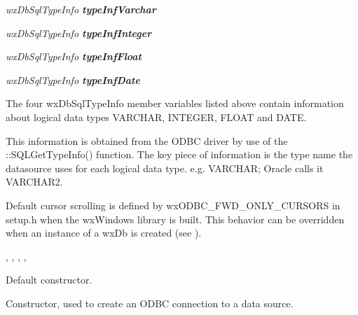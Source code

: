 


{\it wxDbSqlTypeInfo {\bf typeInfVarchar}}

{\it wxDbSqlTypeInfo {\bf typeInfInteger}}

{\it wxDbSqlTypeInfo {\bf typeInfFloat}}

{\it wxDbSqlTypeInfo {\bf typeInfDate}}

\begin{indented}{1cm}
The four wxDbSqlTypeInfo member variables listed above contain information about logical data types VARCHAR, INTEGER, FLOAT and DATE.

This information is obtained from the ODBC driver by use of the ::SQLGetTypeInfo() function.  The key piece of information is the type name the datasource uses for each logical data type. e.g. VARCHAR; Oracle calls it VARCHAR2.
\end{indented}


Default cursor scrolling is defined by wxODBC_FWD_ONLY_CURSORS in setup.h
when the wxWindows library is built.  This behavior can be overridden when 
an instance of a wxDb is created (see ).


, , , , 

\label{wxdbconstr}


Default constructor.


Constructor, used to create an ODBC connection to a data source.


